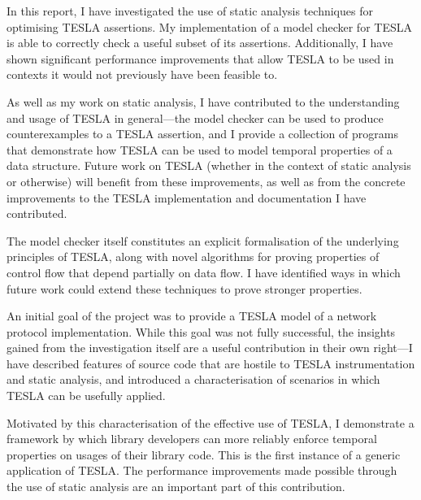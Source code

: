 In this report, I have investigated the use of static analysis techniques for
optimising TESLA assertions. My implementation of a model checker for TESLA is
able to correctly check a useful subset of its assertions. Additionally, I have
shown significant performance improvements that allow TESLA to be used in
contexts it would not previously have been feasible to.

As well as my work on static analysis, I have contributed to the understanding
and usage of TESLA in general---the model checker can be used to produce
counterexamples to a TESLA assertion, and I provide a collection of programs
that demonstrate how TESLA can be used to model temporal properties of a data
structure. Future work on TESLA (whether in the context of static analysis or
otherwise) will benefit from these improvements, as well as from the concrete
improvements to the TESLA implementation and documentation I have contributed.

The model checker itself constitutes an explicit formalisation of the underlying
principles of TESLA, along with novel algorithms for proving properties of
control flow that depend partially on data flow. I have identified ways in which
future work could extend these techniques to prove stronger properties.

An initial goal of the project was to provide a TESLA model of a network
protocol implementation. While this goal was not fully successful, the insights
gained from the investigation itself are a useful contribution in their own
right---I have described features of source code that are hostile to TESLA
instrumentation and static analysis, and introduced a characterisation of
scenarios in which TESLA can be usefully applied.

Motivated by this characterisation of the effective use of TESLA, I demonstrate
a framework by which library developers can more reliably enforce temporal
properties on usages of their library code. This is the first instance of a
generic application of TESLA. The performance improvements made possible through
the use of static analysis are an important part of this contribution.
